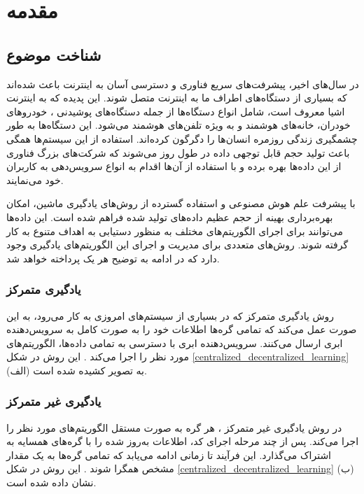 \chapter{مقدمه}

\section{شناخت موضوع}
در سال‌های اخیر، پیشرفت‌های سریع فناوری و دسترسی آسان به اینترنت باعث شده‌اند که بسیاری از دستگاه‌های اطراف ما به اینترنت متصل شوند. این پدیده که به اینترنت اشیا%
معروف است، شامل انواع دستگاه‌ها از جمله دستگاه‌های پوشیدنی%
%
، خودروهای خودران، خانه‌های هوشمند%
و به ویژه تلفن‌های هوشمند%
می‌شود. این دستگاه‌ها به طور چشمگیری زندگی روزمره انسان‌ها را دگرگون کرده‌اند. استفاده از این سیستم‌ها همگی باعث تولید حجم قابل توجهی داده در طول روز می‌شوند که شرکت‌های بزرگ فناوری از این داده‌ها بهره برده و با استفاده از آن‌ها اقدام به انواع سرویس‌‌دهی به کاربران خود می‌نمایند.

با پیشرفت علم هوش مصنوعی و استفاده گسترده از روش‌های یادگیری ماشین، امکان بهره‌برداری بهینه از حجم عظیم داده‌های تولید شده فراهم شده است. این داده‌ها می‌توانند برای اجرای الگوریتم‌های مختلف به منظور دستیابی به اهداف متنوع به کار گرفته شوند. روش‌های متعددی برای مدیریت و اجرای این الگوریتم‌های یادگیری وجود دارد که در ادامه به توضیح هر یک پرداخته خواهد شد.


\subsection{یادگیری متمرکز}
روش یادگیری متمرکز%
که در بسیاری از سیستم‌های امروزی به کار می‌رود، به این صورت عمل می‌کند که تمامی گره‌ها%
اطلاعات خود را به صورت کامل به سرویس‌دهنده ابری%
ارسال می‌کنند. سرویس‌دهنده ابری با دسترسی به تمامی داده‌ها، الگوریتم‌های مورد نظر را اجرا می‌کند
\cite{elbir2022family}.
این روش در شکل
\ref{centralized_decentralized_learning}%
(الف) به تصویر کشیده شده است.


\subsection{یادگیری غیر متمرکز}
در روش یادگیری غیر متمرکز%
، هر گره به صورت مستقل الگوریتم‌های مورد نظر را اجرا می‌کند. پس از چند مرحله اجرای کد، اطلاعات به‌روز شده را با گره‌های همسایه به اشتراک می‌گذارد. این فرآیند تا زمانی ادامه می‌یابد که تمامی گره‌ها به یک مقدار مشخص همگرا شوند
\cite{zhou2019edge}.
این روش در شکل
\ref{centralized_decentralized_learning}%
(ب) نشان داده شده است.

